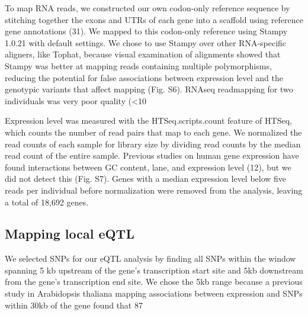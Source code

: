 To map RNA reads, we constructed our own codon-only reference sequence by stitching together the exons and UTRs of each gene into a scaffold using reference gene annotations (31). We mapped to this codon-only reference using Stampy 1.0.21 with default settings. We chose to use Stampy over other RNA-specific aligners, like Tophat, because visual examination of alignments showed that Stampy was better at mapping reads containing multiple polymorphisms, reducing the potential for false associations between expression level and the genotypic variants that affect mapping (Fig. S6). RNAseq readmapping for two individuals was very poor quality (<10%

Expression level was measured with the HTSeq.scripts.count feature of HTSeq, which counts the number of read pairs that map to each gene. We normalized the read counts of each sample for library size by dividing read counts by the median read count of the entire sample. Previous studies on human gene expression have found interactions between GC content, lane, and expression level (12), but we did not detect this (Fig. S7). Genes with a median expression level below five reads per individual before normalization were removed from the analysis, leaving a total of 18,692 genes.

\subsection{Mapping local eQTL}
We selected SNPs for our eQTL analysis by finding all SNPs within the window spanning 5 kb upstream of the gene’s transcription start site and 5kb downstream from the gene’s transcription end site. We chose the 5kb range because a previous study in Arabidopsis thaliana mapping associations between expression and SNPs within 30kb of the gene found that 87%

